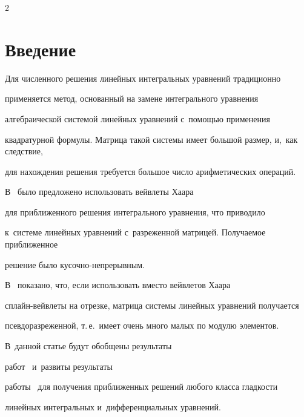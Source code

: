 \begin{multicols}{2}





\label{st\stat}





\section{Введение} 





Для численного решения линейных интегральных уравнений традиционно 


применяется метод, основанный на замене интегрального уравнения 


алгебраической системой линейных уравнений с~помощью применения 


квадратурной формулы. Мат\-ри\-ца такой системы имеет большой размер, и,~как следствие, 


для нахождения решения требуется большое число арифметических операций. 





В~\cite{Lepik3} было предложено использовать вейвлеты Хаара 


для приближенного решения интегрального уравнения, что приводило 


к~системе линейных уравнений с~разреженной матрицей. Получаемое приближенное 


решение было ку\-соч\-но-не\-пре\-рыв\-ным. 





В~\cite{Blatov}  показано, что, если использовать вместо вейвлетов Хаара 


сплайн-вейв\-ле\-ты на отрезке, матрица системы линейных уравнений получается 


псевдоразреженной, т.\,е.\ имеет очень много малых по модулю элементов. 





В~данной статье будут обобщены результаты 


работ~\cite{Lepik1, Lepik2, Lepik3, Lepik4, Lepik} и~развиты результаты 


работы~\cite{Blatov} для получения приближенных решений любого класса гладкости 


линейных интегральных и~дифференциальных уравнений. 



\end{multicols}
